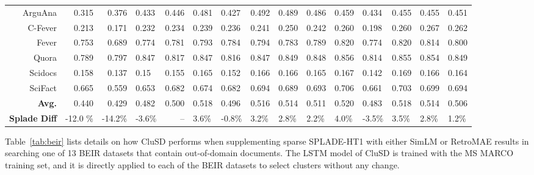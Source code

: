 \begin{table*}[h]
{\begin{tabular}{r r r lr  |lllll|lllll}
                 \hline
                {ArguAna} & 0.315 & 0.376  &  0.433&0.446 & 0.481 &0.427&  0.492 & 0.489 & 0.486 & 0.459 & 0.434 & 0.455 &0.455 & 0.451\\
                {C-Fever}	& 0.213 & 0.171  &  0.232&0.234 & {0.239} &0.236&  0.241 & 0.250 & 0.242 & 0.260 &0.198 &0.260 &0.267& 0.262\\
                {Fever} & 0.753  &0.689  &	 0.774& {0.781} & 0.793 &0.784&  0.794 & 0.783 & 0.789 & 0.820 &0.774 &0.820 &0.814& 0.800\\
                {Quora} & 0.789 & 0.797  &	 0.847&0.817 &	0.847 &0.816&  0.847 & 0.849 &0.848 & 0.856 &0.814 &0.855 &0.854& 0.849\\
                {Scidocs}	& 0.158 &0.137  &	 0.15&0.155 &	{0.165} &0.152&  0.166 & 0.166 & 0.165 & 0.167 &0.142 &0.169&0.166& 0.164\\
                {SciFact}	& 0.665 & 0.559  &  0.653& {0.682} & 0.674 &0.682&  0.694 & 0.689 & 0.693 & 0.706  &0.661 &0.703 &0.699& 0.694\\
                            \hline
                \textbf{Avg.} & 0.440 & 0.429  &  0.482&0.500 & 0.518 &0.496&  0.516 & 0.514 & 0.511 & 0.520 &0.483 &0.518 &0.514& 0.506\\
                \textbf{{Splade Diff}} & -12.0 \% &  -14.2\%  &	 -3.6\% &-- & 3.6\% & -0.8\% &3.2\% & 2.8\% & 2.2\% &4.0\%& -3.5\%& 3.5\%&2.8\%&1.2\%\\
            \hline\hline
		\end{tabular}
		}
	\caption{Zero-shot performance in average NDCG@10 on BEIR datasets. 
}
  \vspace*{-5mm}
	\label{tab:beir}

\end{table*}


Table~\ref{tab:beir} lists  details on how  CluSD  performs when supplementing sparse SPLADE-HT1 with either SimLM or RetroMAE results in
searching one of  13 BEIR datasets that contain out-of-domain documents.
The LSTM model of CluSD  is trained with the  MS MARCO training set,
and it is directly applied to each of the BEIR  datasets to select clusters without any change. 


